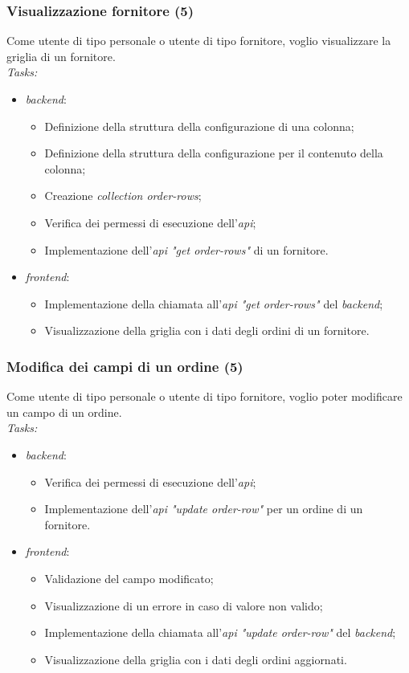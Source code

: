 \subsubsection{Visualizzazione fornitore (5)}
Come utente di tipo personale o utente di tipo fornitore, voglio visualizzare la griglia di un fornitore. \\
\emph{Tasks:}
\begin{itemize}
  \item \emph{\Gls{backend}}:
    \begin{itemize}
      \item Definizione della struttura della configurazione di una colonna;
      \item Definizione della struttura della configurazione per il contenuto della colonna;
      \item Creazione \emph{collection order-rows};
      \item Verifica dei permessi di esecuzione dell'\emph{\acrshort{api}};
      \item Implementazione dell'\emph{\acrshort{api} "get order-rows"} di un fornitore.
    \end{itemize}
  \item \emph{\Gls{frontend}}:
    \begin{itemize}
      \item Implementazione della chiamata all'\emph{\acrshort{api} "get order-rows"} del \emph{\gls{backend}};
      \item Visualizzazione della griglia con i dati degli ordini di un fornitore.
    \end{itemize}
\end{itemize}

\subsubsection{Modifica dei campi di un ordine (5)}
Come utente di tipo personale o utente di tipo fornitore, voglio poter modificare un campo di un ordine. \\
\emph{Tasks:}
\begin{itemize}
  \item \emph{\Gls{backend}}:
    \begin{itemize}
      \item Verifica dei permessi di esecuzione dell'\emph{\acrshort{api}};
      \item Implementazione dell'\emph{\acrshort{api} "update order-row"} per un ordine di un fornitore.
    \end{itemize}
  \item \emph{\Gls{frontend}}:
    \begin{itemize}
      \item Validazione del campo modificato;
      \item Visualizzazione di un errore in caso di valore non valido;
      \item Implementazione della chiamata all'\emph{\acrshort{api} "update order-row"} del \emph{\gls{backend}};
      \item Visualizzazione della griglia con i dati degli ordini aggiornati.
    \end{itemize}
\end{itemize}

